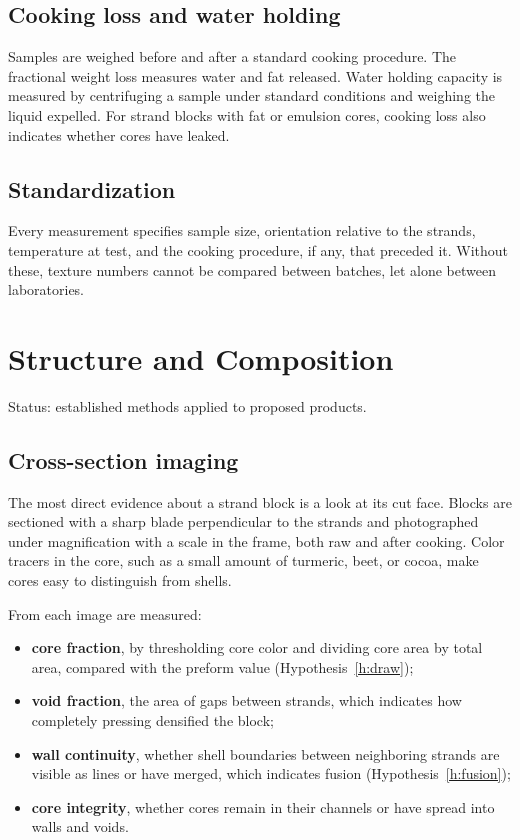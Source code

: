 \documentclass[11pt,openany]{book}
\theoremstyle{definition}
\begin{document}
\section{Cooking loss and water holding}

Samples are weighed before and after a standard cooking procedure. The fractional weight loss measures water and fat released. Water holding capacity is measured by centrifuging a sample under standard conditions and weighing the liquid expelled. For strand blocks with fat or emulsion cores, cooking loss also indicates whether cores have leaked.

\section{Standardization}

Every measurement specifies sample size, orientation relative to the strands, temperature at test, and the cooking procedure, if any, that preceded it. Without these, texture numbers cannot be compared between batches, let alone between laboratories.

\chapter{Structure and Composition}\label{ch:structure}

Status: established methods applied to proposed products.

\section{Cross-section imaging}

The most direct evidence about a strand block is a look at its cut face. Blocks are sectioned with a sharp blade perpendicular to the strands and photographed under magnification with a scale in the frame, both raw and after cooking. Color tracers in the core, such as a small amount of turmeric, beet, or cocoa, make cores easy to distinguish from shells.

From each image are measured:

\begin{itemize}
\item \textbf{core fraction}, by thresholding core color and dividing core area by total area, compared with the preform value (Hypothesis~\ref{h:draw});
\item \textbf{void fraction}, the area of gaps between strands, which indicates how completely pressing densified the block;
\item \textbf{wall continuity}, whether shell boundaries between neighboring strands are visible as lines or have merged, which indicates fusion (Hypothesis~\ref{h:fusion});
\item \textbf{core integrity}, whether cores remain in their channels or have spread into walls and voids.
\end{itemize}
\end{document}
